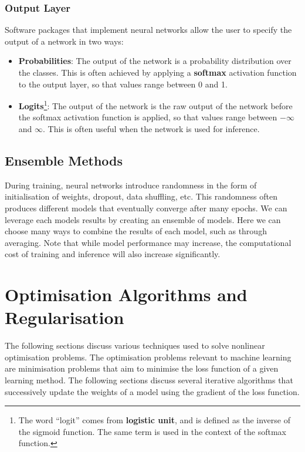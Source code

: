 \documentclass{article}
\begin{document}
\subsubsection{Output Layer}
Software packages that implement neural networks allow the user to
specify the output of a network in two ways:
\begin{itemize}
    \item \textbf{Probabilities}: The output of the network is a
          probability distribution over the classes. This is often achieved
          by applying a \textbf{softmax} activation function to the
          output layer, so that values range between 0 and 1.
    \item \textbf{Logits}\footnote{The word ``logit'' comes from \textbf{logistic unit}, and is defined as the inverse of the sigmoid function. The same term is used in the context of the softmax function.}:
          The output of the network is the raw output
          of the network before the softmax activation function is
          applied, so that values range between \(-\infty\) and \(\infty\).
          This is often useful when the network is used for
          inference.
\end{itemize}
\subsection{Ensemble Methods}
During training, neural networks introduce randomness in the form of
initialisation of weights, dropout, data shuffling, etc. This
randomness often produces different models that eventually converge
after many epochs. We can leverage each models results by creating an
ensemble of models. Here we can choose many ways to combine the results
of each model, such as through averaging. Note that while model
performance may increase, the computational cost of training and
inference will also increase significantly.
\section{Optimisation Algorithms and Regularisation}
The following sections discuss various techniques used to solve
nonlinear optimisation problems. The optimisation problems relevant to
machine learning are minimisation problems that aim to minimise the
loss function of a given learning method. The following sections
discuss several iterative algorithms that successively update the
weights of a model using the gradient of the loss function.
\end{document}

